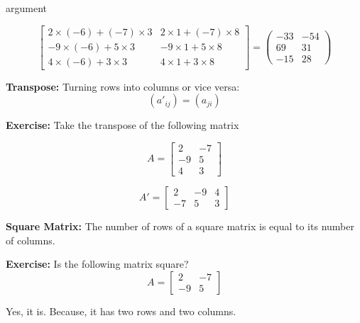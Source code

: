 \begin{labeling}{argument}
    \begin{sol}
        \[
            \begin{bmatrix}
                2 \times (-6) + (-7) \times 3
                 & 2 \times 1 + (-7) \times 8 \\
                -9 \times (-6) + 5 \times 3
                 & -9 \times 1 + 5 \times 8   \\
                4 \times (-6) + 3 \times 3
                 & 4 \times 1 + 3 \times 8
            \end{bmatrix}
            =
            \begin{pmatrix}
                -33 & -54 \\
                69  & 31  \\
                -15 & 28
            \end{pmatrix}
        \]
    \end{sol}

    \item[\textbf{Transpose:}] Turning rows into columns or vice versa:
    \[
        (a'_{ij}) = (a_{ji})
    \]

    \textbf{Exercise:} Take the transpose of the following matrix

    \[
        A = \begin{bmatrix}
            2  & -7 \\
            -9 & 5  \\
            4  & 3
        \end{bmatrix}
    \]

    \begin{sol}
        \[
            A' = \begin{bmatrix}
                2  & -9 & 4 \\
                -7 & 5  & 3
            \end{bmatrix}
        \]
    \end{sol}

    \item[\textbf{Square Matrix:}] The number of rows of a square matrix is equal to its number of columns.

    \textbf{Exercise:} Is the following matrix square?
    \[
        A = \begin{bmatrix}
            2  & -7 \\
            -9 & 5
        \end{bmatrix}
    \]

    \begin{sol}
        Yes, it is. Because, it has two rows and two columns.
    \end{sol}


\end{labeling}
